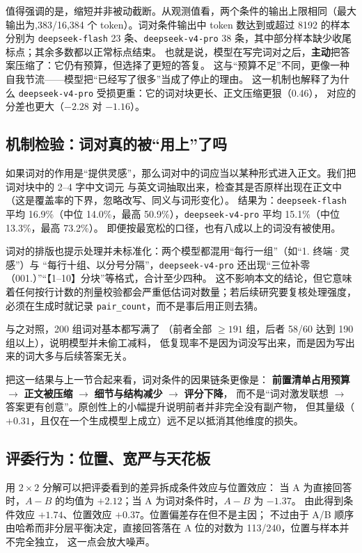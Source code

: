 \documentclass[UTF8,11pt,a4paper]{ctexart}
\newcommand{\deepflash}{\texttt{deepseek-flash}}
\newcommand{\deeppro}{\texttt{deepseek-v4-pro}}
\begin{document}
值得强调的是，缩短并非被动截断。从观测值看，两个条件的输出上限相同（最大输出为,383/16,384 个 token）。词对条件输出中 token 数达到或超过 8192 的样本分别为
\deepflash{} 23 条、\deeppro{} 38 条，其中部分样本缺少收尾标点；其余多数都以正常标点结束。
也就是说，模型在写完词对之后，\textbf{主动}把答案压缩了：它仍有预算，但选择了更短的答复。
这与“预算不足”不同，更像一种自我节流——模型把“已经写了很多”当成了停止的理由。
这一机制也解释了为什么 \deeppro{} 受损更重：它的词对块更长、正文压缩更狠（0.46），
对应的分差也更大（$-2.28$ 对 $-1.16$）。

\FloatBarrier
\subsection{机制检验：词对真的被“用上”了吗}

如果词对的作用是“提供灵感”，那么词对中的词应当以某种形式进入正文。我们把词对块中的 2--4 字中文词元
与英文词抽取出来，检查其是否原样出现在正文中（这是覆盖率的下界，忽略改写、同义与词形变化）。
结果为：\deepflash{} 平均 16.9\%（中位 14.0\%，最高 50.9\%），\deeppro{} 平均 15.1\%（中位 13.3\%，最高 73.2\%）。
即便按最宽松的口径，也有八成以上的词没有被使用。

词对的排版也提示处理并未标准化：两个模型都混用“每行一组”（如“1. 终端·灵感”）与
“每行十组、以分号分隔”，\deeppro{} 还出现“三位补零（001.）”“【1--10】分块”等格式，合计至少四种。
这不影响本文的结论，但它意味着任何按行计数的剂量校验都会严重低估词对数量；若后续研究要复核处理强度，
必须在生成时就记录 \texttt{pair\_count}，而不是事后用正则去猜。

与之对照，200 组词对基本都写满了
（前者全部 $\ge191$ 组，后者 58/60 达到 190 组以上），说明模型并未偷工减料，
低复现率不是因为词没写出来，而是因为写出来的词大多与后续答案无关。

把这一结果与上一节合起来看，词对条件的因果链条更像是：
\textbf{前置清单占用预算} $\rightarrow$ \textbf{正文被压缩} $\rightarrow$ \textbf{细节与结构减少} $\rightarrow$ \textbf{评分下降}，
而不是“词对激发联想 $\rightarrow$ 答案更有创意”。原创性上的小幅提升说明前者并非完全没有副产物，
但其量级（$+0.31$，且仅在一个生成模型上成立）远不足以抵消其他维度的损失。

\subsection{评委行为：位置、宽严与天花板}\label{sec:position}

用 $2\times2$ 分解可以把评委看到的差异拆成条件效应与位置效应：
当 A 为直接回答时，$A-B$ 的均值为 $+2.12$；当 A 为词对条件时，$A-B$ 为 $-1.37$。
由此得到条件效应 $+1.74$、位置效应 $+0.37$。位置偏差存在但不是主因；
不过由于 A/B 顺序由哈希而非分层平衡决定，直接回答落在 A 位的对数为 113/240，位置与样本并不完全独立，
这一点会放大噪声。
\end{document}
